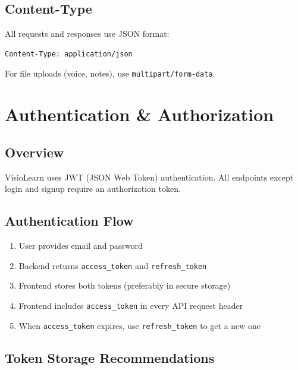 \documentclass[12pt,a4paper,oneside]{article}
\begin{document}
\subsection{Content-Type}

All requests and responses use JSON format:
\begin{lstlisting}
Content-Type: application/json
\end{lstlisting}

For file uploads (voice, notes), use \texttt{multipart/form-data}.

\newpage

\section{Authentication \& Authorization}

\subsection{Overview}

VisioLearn uses JWT (JSON Web Token) authentication. All endpoints except login and signup require an authorization token.

\subsection{Authentication Flow}

\begin{enumerate}
    \item User provides email and password
    \item Backend returns \texttt{access\_token} and \texttt{refresh\_token}
    \item Frontend stores both tokens (preferably in secure storage)
    \item Frontend includes \texttt{access\_token} in every API request header
    \item When \texttt{access\_token} expires, use \texttt{refresh\_token} to get a new one
\end{enumerate}

\subsection{Token Storage Recommendations}
\end{document}
